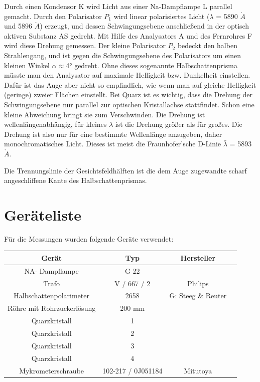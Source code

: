 \documentclass[11pt,ngerman]{scrartcl}
\begin{document}
Durch einen Kondensor K wird Licht aus einer Na-Dampflampe L parallel gemacht. Durch
den Polarisator $P_1$ wird linear polarisiertes Licht ($\lambda$ = 5890 $\mathring{A}$ und 5896 $\mathring{A}$) erzeugt, und dessen
Schwingungsebene anschließend in der optisch aktiven Substanz AS gedreht. Mit Hilfe des
Analysators A und des Fernrohres F wird diese Drehung gemessen. Der kleine Polarisator $P_2$
bedeckt den halben Strahlengang, und ist gegen die Schwingungsebene des Polarisators um einen
kleinen Winkel $\alpha \approx $4° gedreht. Ohne dieses sogenannte Halbschattenprisma müsste man den
Analysator auf maximale Helligkeit bzw. Dunkelheit einstellen. Dafür ist das Auge aber nicht so
empfindlich, wie wenn man auf gleiche Helligkeit (geringe) zweier Flächen einstellt. Bei Quarz
ist es wichtig, dass die Drehung der Schwingungsebene nur parallel zur optischen Kristallachse
stattfindet. Schon eine kleine Abweichung bringt sie zum Verschwinden. Die Drehung ist wellenlängenabhängig, für kleines $\lambda$ ist die Drehung größer als für großes. Die Drehung ist also nur
für eine bestimmte Wellenlänge anzugeben, daher monochromatisches Licht. Dieses ist meist die
Fraunhofer'sche D-Linie $\bar{\lambda}$ = 5893 $\mathring{A}$.

Die Trennungslinie der Gesichtsfeldhälften ist die dem Auge zugewandte scharf angeschliffene
Kante des Halbschattenprismas.


\section{Geräteliste}

\noindent Für die Messungen wurden folgende Geräte verwendet:

\begin{center}
	\begin{tabular}{|c|c|c|c|} \hline
		\textbf{Gerät}             & \textbf{Typ}       & \textbf{Hersteller} \\ \hline

		NA- Dampflampe             & G 22               &                     \\ \hline
		Trafo                      & V / 667 / 2        & Philips             \\ \hline
		Halbschattenpolarimeter    & 2658               & G: Steeg \& Reuter  \\ \hline
		Röhre mit Rohrzuckerlösung & 200 mm             &                     \\ \hline
		Quarzkristall              & 1                  &                     \\ \hline
		Quarzkristall              & 2                  &                     \\ \hline
		Quarzkristall              & 3                  &                     \\ \hline
		Quarzkristall              & 4                  &                     \\ \hline
		Mykrometerschraube         & 102-217 / 0J051184 & Mitutoya            \\ \hline
	\end{tabular}
\end{center}
\end{document}
